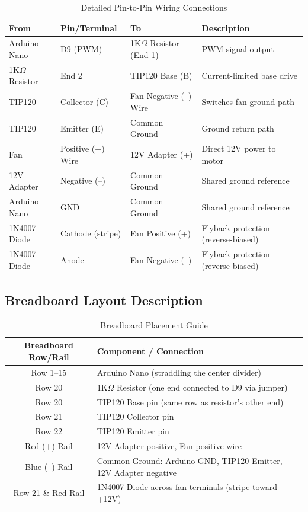 \documentclass[12pt,a4paper]{article}
\begin{document}
\begin{table}[H]
\centering
\renewcommand{\arraystretch}{1.4}
\begin{tabular}{|>{\raggedright}p{3cm}|>{\raggedright}p{2.5cm}|>{\raggedright}p{3cm}|>{\raggedright\arraybackslash}p{5cm}|}
\hline
\textbf{From} & \textbf{Pin/Terminal} & \textbf{To} & \textbf{Description} \\
\hline
Arduino Nano & D9 (PWM) & 1K$\Omega$ Resistor (End 1) & PWM signal output \\
\hline
1K$\Omega$ Resistor & End 2 & TIP120 Base (B) & Current-limited base drive \\
\hline
TIP120 & Collector (C) & Fan Negative (--) Wire & Switches fan ground path \\
\hline
TIP120 & Emitter (E) & Common Ground & Ground return path \\
\hline
Fan & Positive (+) Wire & 12V Adapter (+) & Direct 12V power to motor \\
\hline
12V Adapter & Negative (--) & Common Ground & Shared ground reference \\
\hline
Arduino Nano & GND & Common Ground & Shared ground reference \\
\hline
1N4007 Diode & Cathode (stripe) & Fan Positive (+) & Flyback protection (reverse-biased) \\
\hline
1N4007 Diode & Anode & Fan Negative (--) & Flyback protection (reverse-biased) \\
\hline
\end{tabular}
\caption{Detailed Pin-to-Pin Wiring Connections}
\label{tab:connections}
\end{table}

\subsection{Breadboard Layout Description}

\begin{table}[H]
\centering
\renewcommand{\arraystretch}{1.3}
\begin{tabular}{|c|l|}
\hline
\textbf{Breadboard Row/Rail} & \textbf{Component / Connection} \\
\hline
Row 1--15 & Arduino Nano (straddling the center divider) \\
\hline
Row 20 & 1K$\Omega$ Resistor (one end connected to D9 via jumper) \\
\hline
Row 20 & TIP120 Base pin (same row as resistor's other end) \\
\hline
Row 21 & TIP120 Collector pin \\
\hline
Row 22 & TIP120 Emitter pin \\
\hline
Red (+) Rail & 12V Adapter positive, Fan positive wire \\
\hline
Blue (--) Rail & Common Ground: Arduino GND, TIP120 Emitter, 12V Adapter negative \\
\hline
Row 21 \& Red Rail & 1N4007 Diode across fan terminals (stripe toward +12V) \\
\hline
\end{tabular}
\caption{Breadboard Placement Guide}
\label{tab:breadboard}
\end{table}
\end{document}
